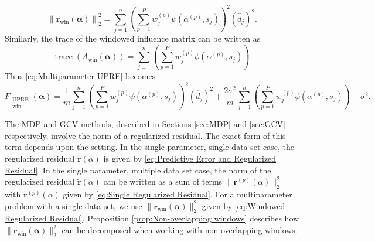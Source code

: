\documentclass[12pt]{article}
\newcommand{\mA}{m}	%
\newcommand{\rVec}{\mathbf{r}}	%
\DeclareMathOperator{\trace}{trace}		%
\newcommand{\dft}[1]{\widehat{#1}}	%
\newcommand{\regparam}{\alpha}  %
\newcommand{\regparamVec}{\bm{\regparam}}   %
\newcommand{\rBig}{\widetilde{\rVec}}	%
\newcommand{\filt}{\phi}
\newcommand{\mfilt}{\psi}
\newcommand{\noiseSD}{\sigma}	%
\newcommand{\singular}{s}	%
\newcommand{\UWin}{F_{\substack{\text{UPRE} \\ \text{win}}}}	%
\begin{document}
\begin{equation}
\label{eq:Windowed Regularized Residual}
    \left\|\rVec_\text{win}(\regparamVec)\right\|_2^2 = \sum_{j=1}^{n} \left(\sum_{p=1}^{P} w_j^{(p)} \mfilt\left(\regparam^{(p)},\singular_j\right) \right)^2 \left(\dft{d}_j\right)^2.
\end{equation}
Similarly, the trace of the windowed influence matrix can be written as
\begin{equation}
    \trace\left(A_\text{win}(\regparamVec)\right) = \sum_{j=1}^{n} \left(\sum_{p=1}^{P} w_j^{(p)} \filt\left(\regparam^{(p)},\singular_j\right) \right).
\end{equation}
Thus \eqref{eq:Multiparameter UPRE} becomes
\begin{equation}
\label{eq:Multiparameter UPRE 2}
    \UWin(\regparamVec) = \frac{1}{\mA}\sum_{j=1}^{n} \left(\sum_{p=1}^{P} w_j^{(p)} \mfilt\left(\regparam^{(p)},\singular_j\right) \right)^2 \left(\dft{d}_j\right)^2 + \frac{2\noiseSD^2}{\mA}\sum_{j=1}^{n} \left(\sum_{p=1}^{P} w_j^{(p)} \filt\left(\regparam^{(p)},\singular_j\right) \right) - \noiseSD^2.
\end{equation}

The MDP and GCV methods, described in Sections \ref{sec:MDP} and \ref{sec:GCV} respectively, involve the norm of a regularized residual. The exact form of this term depends upon the setting. In the single parameter, single data set case, the regularized residual $\rVec(\regparam)$ is given by \eqref{eq:Predictive Error and Regularized Residual}. In the single parameter, multiple data set case, the norm of the regularized residual $\rBig(\regparam)$ can be written as a sum of terms $\|\rVec^{(p)}(\regparam)\|_2^2$ with $\rVec^{(p)}(\regparam)$ given by \eqref{eq:Single Regularized Residual}. For a multiparameter problem with a single data set, we use $\|\rVec_{\text{win}}(\regparamVec)\|_2^2$ given by \eqref{eq:Windowed Regularized Residual}. Proposition \ref{prop:Non-overlapping windows} describes how $\|\rVec_{\text{win}}(\regparamVec)\|_2^2$ can be decomposed when working with non-overlapping windows.
\end{document}
